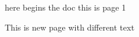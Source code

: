 \documentclass[a4paper]{article}
\date{17 May 2035}
\begin{document}
here begins the doc this is page 1\\
\newpage

This is new page with different text
\end{document}

